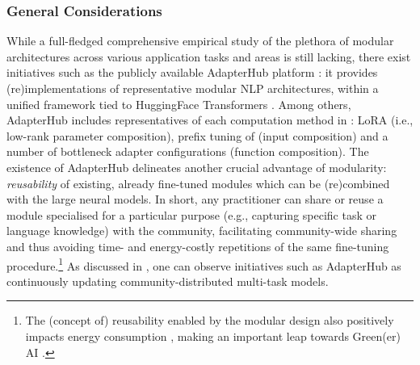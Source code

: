


\subsubsection{General Considerations}
\label{sec:app_summary}
While a full-fledged comprehensive empirical study of the plethora of modular architectures across various application tasks and areas is still lacking, there exist initiatives such as the publicly available AdapterHub platform \citep{pfeiffer-etal-2020-adapterhub}: it provides (re)implementations of representative modular NLP architectures, within a unified framework tied to HuggingFace Transformers \citep{wolf2019huggingface}. Among others, AdapterHub includes representatives of each computation method in : LoRA \citep{hu2021lora} (i.e., low-rank parameter composition), prefix tuning of \cite{Li2020PrefixTuning} (input composition) and a number of bottleneck adapter configurations (function composition). %
The existence of AdapterHub delineates another crucial advantage of modularity: \textit{reusability} of existing, already fine-tuned modules which can be (re)combined with the large neural models. In short, any practitioner can share or reuse a module specialised for a particular purpose (e.g., capturing specific task or language knowledge) with the community, facilitating community-wide sharing and thus avoiding time- and energy-costly repetitions of the same fine-tuning procedure.\footnote{The (concept of) reusability enabled by the modular design also positively impacts energy consumption \citep{strubell-etal-2019-energy}, making an important leap towards Green(er) AI \citep{Schwartz:2020greenai}.} As discussed in , one can observe initiatives such as AdapterHub as continuously updating community-distributed multi-task models.


